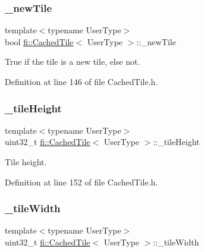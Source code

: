 \subsubsection{\texorpdfstring{\+\_\+new\+Tile}{\_newTile}}
{\footnotesize\ttfamily template$<$typename User\+Type$>$ \\
bool \hyperlink{classfi_1_1CachedTile}{fi\+::\+Cached\+Tile}$<$ User\+Type $>$\+::\+\_\+new\+Tile\hspace{0.3cm}{\ttfamily [protected]}}



True if the tile is a new tile, else not. 



Definition at line 146 of file Cached\+Tile.\+h.

\mbox{\label{classfi_1_1CachedTile_aed23a0a9cf8b01a84bc55835b9ffc102}} 
\subsubsection{\texorpdfstring{\+\_\+tile\+Height}{\_tileHeight}}
{\footnotesize\ttfamily template$<$typename User\+Type$>$ \\
uint32\+\_\+t \hyperlink{classfi_1_1CachedTile}{fi\+::\+Cached\+Tile}$<$ User\+Type $>$\+::\+\_\+tile\+Height\hspace{0.3cm}{\ttfamily [protected]}}



Tile height. 



Definition at line 152 of file Cached\+Tile.\+h.

\mbox{\label{classfi_1_1CachedTile_af77038cc15872076b1d02323ca6f2353}} 
\subsubsection{\texorpdfstring{\+\_\+tile\+Width}{\_tileWidth}}
{\footnotesize\ttfamily template$<$typename User\+Type$>$ \\
uint32\+\_\+t \hyperlink{classfi_1_1CachedTile}{fi\+::\+Cached\+Tile}$<$ User\+Type $>$\+::\+\_\+tile\+Width\hspace{0.3cm}{\ttfamily [protected]}}



